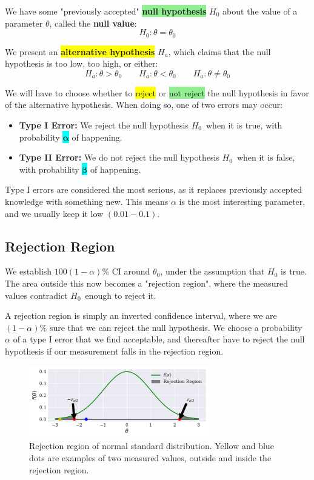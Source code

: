 \documentclass[12p,a4paper]{report}
\renewcommand{\b}{\boldsymbol}
\newcommand{\yll}{\colorbox{yellow}}
\newcommand{\grr}{\colorbox{lightgreen}}
\newcommand{\bll}{\colorbox{cyan}}
\begin{document}
We have some "previously accepted" \grr{\textbf{null hypothesis}} $H_0$ about the value of a parameter $\theta$, called the \textbf{null value}:
\[
    H_0: \theta = \theta_0
\]

We present an \yll{\textbf{alternative hypothesis}} $H_a$, which claims that the null hypothesis is too low, too high, or either:
\[
    H_a: \theta > \theta_0 \quad\quad H_a: \theta < \theta_0 \quad\quad H_a: \theta \neq \theta_0
\]

We will have to choose whether to \yll{reject} or \grr{not reject} the null hypothesis in favor of the alternative hypothesis. When doing so, one of two errors may occur:
\begin{tcolorbox}
    \begin{itemize}
        \item \textbf{Type I Error:} We reject the null hypothesis $H_0$ when it is true, with probability \bll{$\b \alpha$} of happening.
        \item \textbf{Type II Error:} We do not reject the null hypothesis $H_0$ when it is false, with probability \bll{$\b \beta$} of happening.
    \end{itemize}
\end{tcolorbox}
Type I errors are considered the most serious, as it replaces previously accepted knowledge with something new. This means $\alpha$ is the most interesting parameter, and we usually keep it low $(0.01-0.1)$.


\subsection*{Rejection Region}
We establish $100(1-\alpha)\%$ CI around $\theta_0$, under the assumption that $H_0$ is true. The area outside this now becomes a "rejection region", where the measured values contradict $H_0$ enough to reject it.

A rejection region is simply an inverted confidence interval, where we are $(1  - \alpha)\%$ sure that we can reject the null hypothesis. We choose a probability $\alpha$ of a type I error that we find acceptable, and thereafter have to reject the null hypothesis if our measurement falls in the rejection region.

\begin{figure}[H]
    \centering
    \includegraphics[width=0.7\textwidth]{figs/HT:1.pdf}
    \caption{Rejection region of normal standard distribution. Yellow and blue dots are examples of two measured values, outside and inside the rejection region.}
    \label{fig:3} 
\end{figure}
\end{document}
